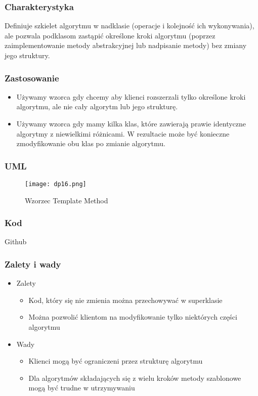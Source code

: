 \documentclass[a4paper,15pt]{article}
\begin{document}
\subsubsection{Charakterystyka}
Definiuje szkielet algorytmu w nadklasie (operacje i kolejność ich wykonywania), ale pozwala podklasom zastąpić określone kroki algorytmu (poprzez zaimplementowanie metody abstrakcyjnej lub nadpisanie metody) bez zmiany jego struktury.

\subsubsection{Zastosowanie}
\begin{itemize}
\item Używamy wzorca gdy chcemy aby klienci rozszerzali tylko określone kroki algorytmu, ale nie cały algorytm lub jego strukturę.
\item Używamy wzorca gdy mamy kilka klas, które zawierają prawie identyczne algorytmy z niewielkimi różnicami. W rezultacie może być konieczne zmodyfikowanie obu klas po zmianie algorytmu.
\end{itemize}

\subsubsection{UML}

\begin{figure}[H]
\centering
  \texttt{[image: dp16.png]}
  \caption{Wzorzec Template Method}
\end{figure}

\subsubsection{Kod}
Github

\subsubsection{Zalety i wady}


\begin{itemize}
\item Zalety
\begin{itemize}
\item Kod, który się nie zmienia można przechowywać w superklasie 
\item Można pozwolić klientom na modyfikowanie tylko niektórych części algorytmu
\end{itemize}
\item Wady
\begin{itemize}
\item Klienci mogą być ograniczeni przez strukturę algorytmu
\item Dla algorytmów składających się z wielu kroków metody szablonowe mogą być trudne w utrzymywaniu
\end{itemize}
\end{itemize}
\end{document}
